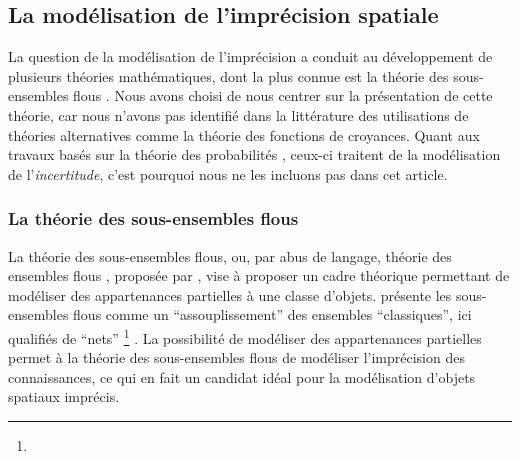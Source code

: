 \subsection{La modélisation de l'imprécision spatiale}

La question de la modélisation de l’imprécision a conduit au
développement de plusieurs théories mathématiques, dont la plus connue
est la théorie des sous-ensembles flous \autocite{Zadeh1965}. Nous
avons choisi de nous centrer sur la présentation de cette théorie, car
nous n’avons pas identifié dans la littérature des utilisations de
théories alternatives comme la théorie des fonctions de
croyances. Quant aux travaux basés sur la théorie des probabilités
\autocite{Tossebro2002,Tossebro2008}, ceux-ci traitent de la
modélisation de l’\emph{incertitude}, c’est pourquoi nous ne les
incluons pas dans cet article.





\subsubsection{La théorie des sous-ensembles flous}

La théorie des sous-ensembles flous, ou, par abus de langage, théorie
des ensembles flous \autocite{Bouchon-Meunier2007}, proposée par
\textcite{Zadeh1965}, vise à proposer un cadre théorique permettant de
modéliser des appartenances partielles à une classe
d’objets. \textcite{Bouchon-Meunier1995} présente les sous-ensembles
flous comme un \enquote{assouplissement} des ensembles
\enquote{classiques}, ici qualifiés de \enquote{nets} \footnote{}
\autocite{Smithson2006}. La possibilité de modéliser des appartenances
partielles permet à la théorie des sous-ensembles flous de modéliser
l’imprécision des connaissances, ce qui en fait un candidat idéal pour
la modélisation d’objets spatiaux imprécis.

